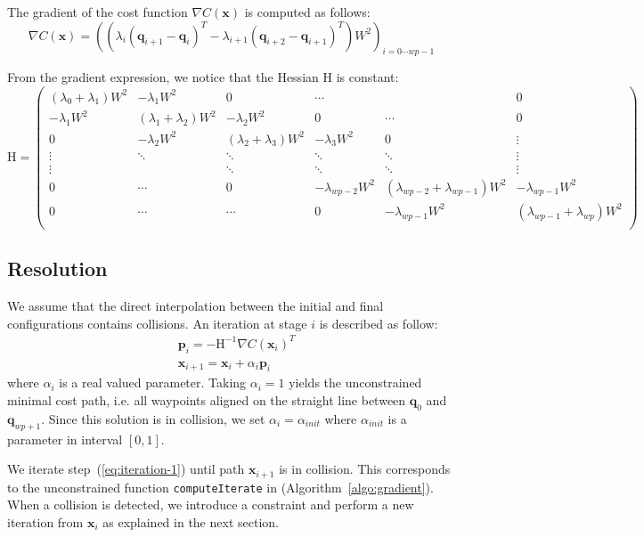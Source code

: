 \documentclass{tADR2e}
\newcommand\p{\mathbf{p}}
\newcommand\conf{\mathbf{q}}
\newcommand\xx{\mathbf{x}} %
\newcommand\cost{C}
\newcommand\weight{W}
\begin{document}
The gradient of the cost function $\nabla \cost (\xx)$ is computed as follows:
$$
\nabla \cost (\xx) = 
\left( (\lambda_{i}(\conf_{i+1} - \conf_{i})^T - \lambda_{i+1}(\conf_{i+2} - \conf_{i+1})^T) \weight^2 \right)_{i=0\cdots wp-1}
$$


From the gradient expression, we notice that the Hessian $\mbox{H}$ is constant:
$$
\mbox{H} = \left(\begin{array}{cccccc}
(\lambda_{0}+\lambda_{1})\weight^2 & -\lambda_{1}\weight^2 & 0 & \cdots & & 0 \\
-\lambda_{1}\weight^2 & (\lambda_{1}+\lambda_{2})\weight^2 & -\lambda_{2}\weight^2 & 0 & \cdots & 0 \\
0 & -\lambda_{2}\weight^2 &  (\lambda_{2}+\lambda_{3})\weight^2 & -\lambda_{3}\weight^2 & 0 & \vdots \\
\vdots & \ddots & \ddots & \ddots & \ddots & \vdots\\
\vdots & & \ddots & \ddots & \ddots & \vdots\\
0 & \cdots  & 0 & -\lambda_{wp-2}\weight^2 & (\lambda_{wp-2}+\lambda_{wp-1})\weight^2 & -\lambda_{wp-1}\weight^2 \\
0 & \cdots &  \cdots & 0 & -\lambda_{wp-1}\weight^2 & (\lambda_{wp-1}+\lambda_{wp})\weight^2  \\
\end{array}\right)
$$

\subsection {Resolution}
We assume that the direct interpolation between the initial and final configurations contains collisions. An iteration at stage $i$ is described as follow:
\begin{equation}\label{eq:iteration-1}
\begin{split}
& \p_i =  -\mbox{H}^{-1} \nabla \cost(\xx_i)^{T} \\
& \xx_{i+1} =  \xx_{i} + \alpha_i \p_i
\end{split} 
\end{equation}
where $\alpha_i$ is a real valued parameter. Taking $\alpha_i=1$ yields the 
unconstrained minimal cost path, i.e. all waypoints aligned on the straight line 
between $\conf_0$ and $\conf_{wp+1}$. Since this solution is in collision, we set 
$\alpha_i = \alpha_{init}$
where $\alpha_{init}$ is a parameter in interval $[0,1]$.

We iterate step~(\ref{eq:iteration-1}) until path $\xx_{i+1}$ is in collision. This 
corresponds to the unconstrained function \texttt{computeIterate} in 
(Algorithm~\ref{algo:gradient}).
When a collision is detected, we introduce a constraint and perform a new 
iteration from $\xx_i$ as explained in the next section.
\end{document}

